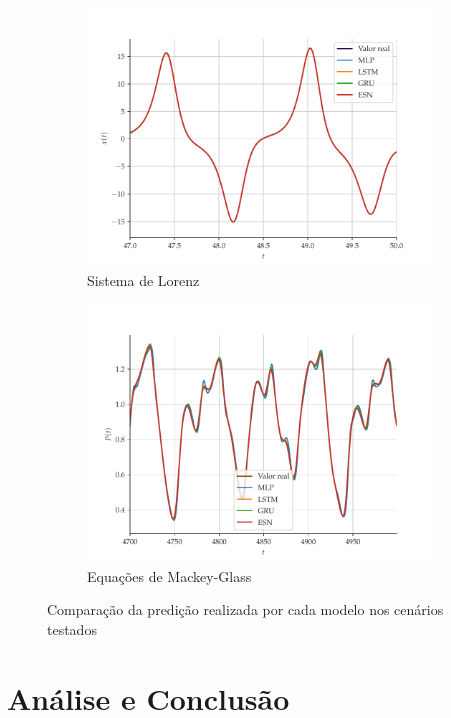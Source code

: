 \documentclass{article}
\begin{document}
\begin{figure}[!ht]
\begin{subfigure}[t]{0.2\textwidth}
         \includegraphics[scale=0.2]{vs-lorenz-zoom.pdf}
         \caption{Sistema de Lorenz}
     \end{subfigure}
     \centering
     \begin{subfigure}[t]{0.2\textwidth}
         \includegraphics[scale=0.2]{vs-mackeyglass-zoom.pdf}
         \caption{Equações de Mackey-Glass}
     \end{subfigure}
     \centering     
     \caption{Comparação da predição realizada por cada modelo nos cenários testados}
     \label{fig:series-comparison}
\end{figure}

\section{Análise e Conclusão}
\end{document}
